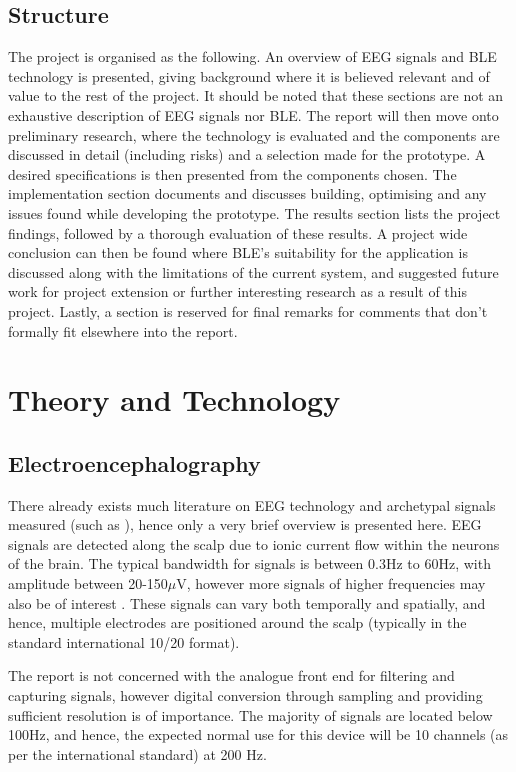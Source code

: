 \documentclass[]{article}
\begin{document}
\subsection {Structure}
The project is organised as the following. An overview of \ac{EEG} signals and \ac{BLE} technology is presented, giving background where it is believed relevant and of value to the rest of the project. It should be noted that these sections are not an exhaustive description of \ac{EEG} signals nor \ac{BLE}. The report will then move onto preliminary research, where the technology is evaluated and the components are discussed in detail (including risks) and a selection made for the prototype. A desired specifications is then presented from the components chosen.  The implementation section documents and discusses building, optimising and any issues found while developing the prototype. The results section lists the project findings, followed by a thorough evaluation of these results. A project wide conclusion can then be found where \ac{BLE}'s suitability for the application is discussed along with the limitations of the current system, and suggested future work for project extension or further interesting research as a result of this project. Lastly, a section is reserved for final remarks for comments that don't formally fit elsewhere into the report.

\clearpage
\section{Theory and Technology}
\subsection{Electroencephalography}

There already exists much literature on \ac{EEG} technology and archetypal signals measured (such as \cite{Teplan2002}), hence only a very brief overview is presented here. \ac{EEG} signals are detected along the scalp due to ionic current flow within the neurons of the brain. The typical bandwidth for signals is between 0.3Hz to 60Hz, with amplitude between 20-150$\mu$V, however more signals of higher frequencies may also be of interest \cite{Urrestarazu2006}. These signals can vary both temporally and spatially, and hence, multiple electrodes are positioned  around the scalp (typically in the standard international 10/20 format).

 The report is not concerned with the analogue front end for filtering and capturing signals, however digital conversion through sampling and providing sufficient resolution is of importance. The majority of signals are located below 100Hz, and hence, the expected normal use for this device will be 10 channels (as per the international standard) at 200 Hz. 
\end{document}
